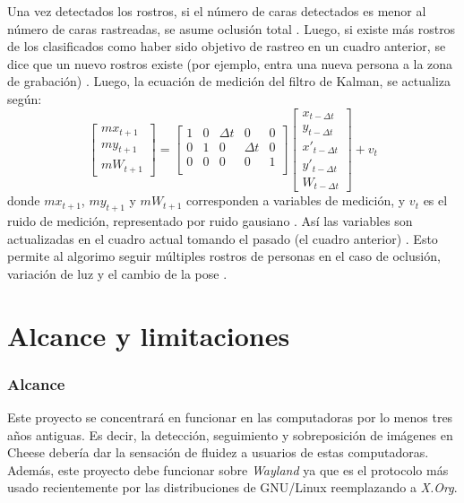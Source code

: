 \documentclass[a4paper,openright,12pt]{report}
\begin{document}
Una vez detectados los rostros, si el número de caras detectados es menor al
número de caras rastreadas, se asume oclusión total \cite{shaik2007robust}. Luego, si existe más
rostros de los clasificados como haber sido objetivo de rastreo en un cuadro
anterior, se dice que un nuevo rostros existe (por ejemplo, entra una nueva
persona a la zona de grabación) \cite{shaik2007robust}. Luego, la ecuación de medición del filtro de Kalman, se actualiza según:
\[
    \begin{bmatrix}
        mx_{t+1}\\
        my_{t+1}\\
        mW_{t+1}
    \end{bmatrix}
    =
    \begin{bmatrix}
        1   &   0   &   \Delta{t}   &   0           &   0\\
        0   &   1   &   0           &   \Delta{t}   &   0\\
        0   &   0   &   0           &   0           &   1\\
    \end{bmatrix}
    \begin{bmatrix}
        x_{t - \Delta{t}}\\
        y_{t - \Delta{t}}\\
        x'_{t - \Delta{t}}\\
        y'_{t - \Delta{t}}\\
        W_{t - \Delta{t}}
    \end{bmatrix}
    +
    v_{t}
\]
donde $mx_{t+1}$, $my_{t+1}$ y $mW_{t+1}$ corresponden a variables de medición,
y $v_{t}$ es el ruido de medición, representado por ruido gausiano \cite{shaik2007robust}. Así las
variables son actualizadas en el cuadro actual tomando el pasado (el cuadro
anterior) \cite{shaik2007robust}. Esto permite al algorimo seguir múltiples rostros de personas en el
caso de oclusión, variación de luz y el cambio de la pose \cite{shaik2007robust}.


\section{Alcance y limitaciones}

\subsubsection{Alcance}
    Este proyecto se concentrará en funcionar en las computadoras por lo menos
    tres años antiguas. Es decir, la detección, seguimiento y sobreposición de imágenes en
    Cheese debería dar la sensación de fluidez a usuarios de estas computadoras.
    Además, este proyecto debe funcionar sobre \textit{Wayland} ya que es el
    protocolo más usado recientemente por las distribuciones de GNU/Linux
    reemplazando a \textit{X.Org}.
\end{document}
